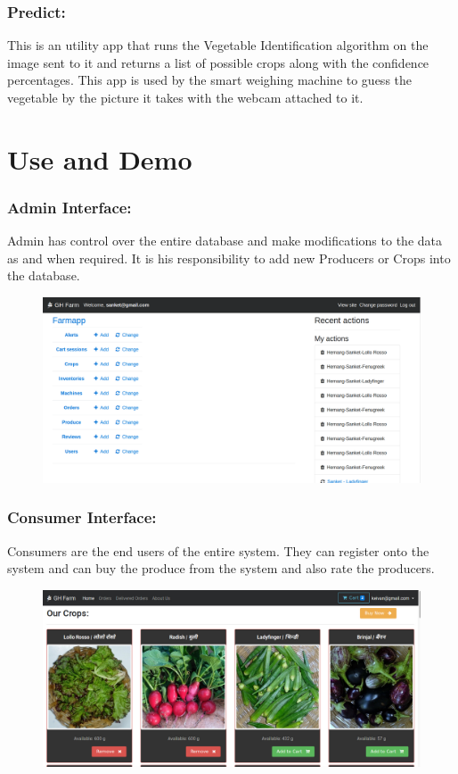 \documentclass[a4paper,12pt,oneside]{book}
\begin{document}
		\subsubsection{Predict:}
		This is an utility app that runs the Vegetable Identification algorithm on the image sent to it and returns a list of possible crops along with the confidence percentages. This app is used by the smart weighing machine to guess the vegetable by the picture it takes with the webcam attached to it.
		
		\section{Use and Demo}
		\subsubsection{Admin Interface:}
		Admin has control over the entire database and make modifications to the data as and when required. It is his responsibility to add new Producers or Crops into the database.
		\begin{figure}[!ht]
			\centering
			
			\includegraphics[width=1.0\linewidth]{admin.png}
		\end{figure}
		
		\subsubsection{Consumer Interface:}
		Consumers are the end users of the entire system. They can register onto the system and can buy the produce from the system and also rate the producers.
		\begin{figure}[!ht]
			\centering
			\includegraphics[width=1.0\linewidth]{screenshot.jpg}
		\end{figure}
		\newpage
\end{document}
